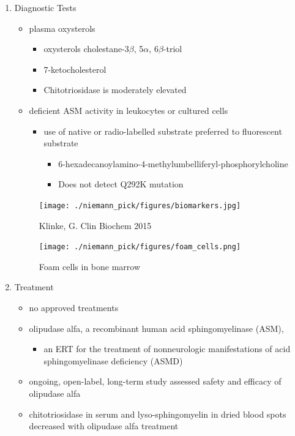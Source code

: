 \documentclass{scrartcl}
\begin{document}
\begin{enumerate}
\item Diagnostic Tests
\label{sec:orga4fd005}
\begin{itemize}
\item plasma oxysterols
\begin{itemize}
\item oxysterols cholestane-3\(\beta\), 5\(\alpha\), 6\(\beta\)-triol
\item 7-ketocholesterol
\item Chitotriosidase is moderately elevated
\end{itemize}
\item deficient ASM activity in leukocytes or cultured cells
\begin{itemize}
\item use of native or radio-labelled substrate preferred to fluorescent substrate
\begin{itemize}
\item 6-hexadecanoylamino-4-methylumbelliferyl-phosphorylcholine
\item Does not detect Q292K mutation
\end{itemize}
\end{itemize}
\end{itemize}

\begin{figure}[htbp]
\centering
\texttt{[image: ./niemann\_pick/figures/biomarkers.jpg]}
\caption{\label{fig:orgc96296c}
Klinke, G. Clin Biochem 2015}
\end{figure}

\begin{figure}[htbp]
\centering
\texttt{[image: ./niemann\_pick/figures/foam\_cells.png]}
\caption{\label{fig:org30a0032}
Foam cells in bone marrow}
\end{figure}

\item Treatment
\label{sec:orgc98bdcb}
\begin{itemize}
\item no approved treatments
\item olipudase alfa, a recombinant human acid sphingomyelinase (ASM),
\begin{itemize}
\item an ERT for the treatment of nonneurologic manifestations of acid sphingomyelinase deficiency (ASMD)
\end{itemize}
\item ongoing, open-label, long-term study assessed safety and efficacy of olipudase alfa
\item chitotriosidase in serum and lyso-sphingomyelin in dried blood spots
decreased with olipudase alfa treatment
\end{itemize}
\end{enumerate}
\end{document}

